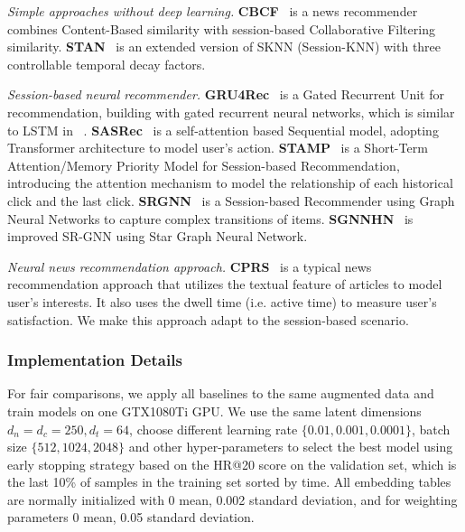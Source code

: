 \textit{Simple approaches without deep learning.}
\textbf{CBCF}~\cite{sottocornola2018session} is a news recommender combines Content-Based similarity with session-based Collaborative Filtering similarity.
\textbf{STAN}~\cite{garg2019sequence} is an extended version of SKNN (Session-KNN) with three controllable temporal decay factors.

\textit{Session-based neural recommender.}
  \textbf{GRU4Rec}~\cite{hidasi2015session,hidasi2018recurrent} is a Gated Recurrent Unit for recommendation, building with gated recurrent neural networks, which is similar to LSTM in ~\cite{moreira_news_2018}.
  \textbf{SASRec}~\cite{kang_self-attentive_2018} is a self-attention based Sequential model, adopting Transformer architecture to model user's action.
  \textbf{STAMP}~\cite{liu2018stamp} is a Short-Term Attention/Memory Priority Model for Session-based Recommendation, introducing the attention mechanism to model the relationship of each historical click and the last click.
  \textbf{SRGNN}~\cite{wu2019session} is a Session-based Recommender using Graph Neural Networks to capture complex transitions of items.
  \textbf{SGNNHN}~\cite{pan2020star} is improved SR-GNN using Star Graph Neural Network.

\textit{Neural news recommendation approach.}
\textbf{CPRS}~\cite{wu2020CPRS} is a typical news recommendation approach that utilizes the textual feature of articles to model user's interests. It also uses the dwell time (i.e. active time) to measure user's satisfaction. We make this approach adapt to the session-based scenario.

\subsubsection{Implementation Details}
For fair comparisons, we apply all baselines to the same augmented data and train 
models on one GTX1080Ti GPU.
We use the same latent dimensions $d_n=d_c=250, d_t=64$, choose different learning rate $\{0.01, 0.001, 0.0001\}$, batch size $\{512, 1024, 2048\}$ and other hyper-parameters to select the best model using early stopping strategy based on the HR@20 score on the validation set, which is the last 10\% of samples in the training set sorted by time. All embedding tables are normally initialized with 0 mean, 0.002 standard deviation, and for weighting parameters 0 mean, 0.05 standard deviation.

